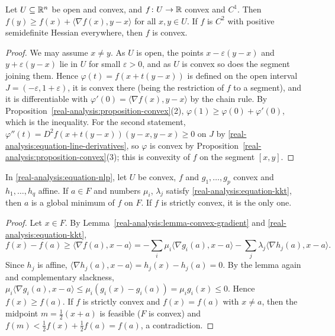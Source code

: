 \begin{lemma}\label{real-analysis:lemma-convex-gradient}
Let $U \subseteq \mathbb{R}^n$ be open and convex, and $f \colon U \to \mathbb{R}$ convex and $C^1$. Then $f(y) \geq f(x) + \langle\nabla f(x), y - x\rangle$ for all $x, y \in U$. If $f$ is $C^2$ with positive
semidefinite Hessian everywhere, then $f$ is convex.
\end{lemma}

\begin{proof}
We may assume $x \neq y$. As $U$ is open, the points $x - \varepsilon(y - x)$ and $y + \varepsilon(y - x)$ lie in $U$ for small $\varepsilon > 0$, and as $U$ is convex so does the segment joining them.
Hence $\varphi(t) = f(x + t(y - x))$ is defined on the open interval $J = (-\varepsilon, 1 + \varepsilon)$, it is convex there (being the restriction of $f$ to a segment), and it is differentiable with
$\varphi'(0) = \langle\nabla f(x), y - x\rangle$ by the chain rule. By Proposition~\ref{real-analysis:proposition-convex}(2), $\varphi(1) \geq \varphi(0) + \varphi'(0)$, which is the inequality. For the
second statement, $\varphi''(t) = D^2f(x + t(y - x))(y - x, y - x) \geq 0$ on $J$ by \eqref{real-analysis:equation-line-derivatives}, so $\varphi$ is convex by
Proposition~\ref{real-analysis:proposition-convex}(3); this is convexity of $f$ on the segment $[x, y]$.
\end{proof}

\begin{theorem}\label{real-analysis:theorem-kkt-convex}
In \eqref{real-analysis:equation-nlp}, let $U$ be convex, $f$ and $g_1, \ldots, g_p$ convex and $h_1, \ldots, h_q$ affine. If $a \in F$ and numbers $\mu_i$, $\lambda_j$ satisfy
\eqref{real-analysis:equation-kkt}, then $a$ is a global minimum of $f$ on $F$. If $f$ is strictly convex, it is the only one.
\end{theorem}

\begin{proof}
Let $x \in F$. By Lemma~\ref{real-analysis:lemma-convex-gradient} and \eqref{real-analysis:equation-kkt},
\[
f(x) - f(a) \geq \langle\nabla f(a), x - a\rangle = -\sum_i\mu_i\langle\nabla g_i(a), x - a\rangle - \sum_j\lambda_j\langle\nabla h_j(a), x - a\rangle.
\]
Since $h_j$ is affine, $\langle\nabla h_j(a), x - a\rangle = h_j(x) - h_j(a) = 0$. By the lemma again and complementary slackness,
$\mu_i\langle\nabla g_i(a), x - a\rangle \leq \mu_i(g_i(x) - g_i(a)) = \mu_ig_i(x) \leq 0$. Hence $f(x) \geq f(a)$. If $f$ is strictly convex and $f(x) = f(a)$ with $x \neq a$, then the midpoint
$m = \frac12(x + a)$ is feasible ($F$ is convex) and $f(m) < \frac12f(x) + \frac12f(a) = f(a)$, a contradiction.
\end{proof}

